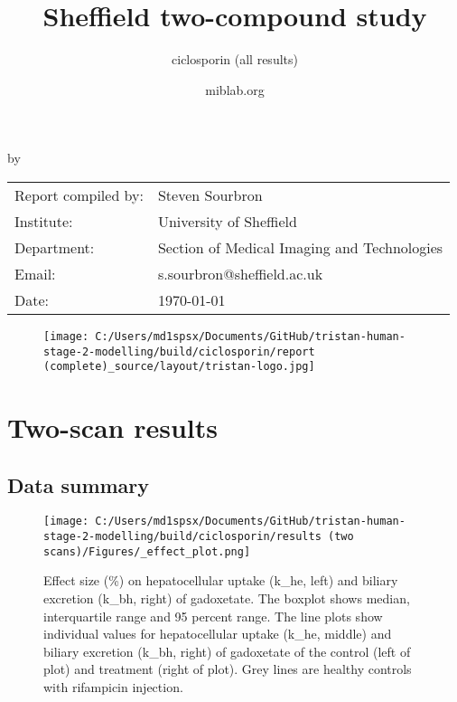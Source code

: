 \documentclass{epflreport}%
\begin{document}
%
\normalsize%
\frontmatter%
\title{Sheffield two{-}compound study}%
\subtitle{ciclosporin (all results)}%
\author{miblab.org}%
\subject{D2.10 {-} Internal report}%
%
%
%
\makecover%
\begin{titlepage}%
\begin{center}%
\makeatletter%
\largetitlestyle\fontsize{45}{45}\selectfont\@title%
\makeatother%
\linebreak%
\makeatletter%
\ifdefvoid{\@subtitle}{}{\bigskip\titlestyle\fontsize{20}{20}\selectfont\@subtitle}%
\makeatother%
\linebreak%
\bigskip%
\bigskip%
by%
\linebreak%
\bigskip%
\bigskip%
\makeatletter%
\largetitlestyle\fontsize{25}{25}\selectfont\@author%
\makeatother%
\vfill%
\large%
\begin{tabular}{ll}%
\hline%
Report compiled by: &Steven Sourbron\\%
Institute: &University of Sheffield\\%
Department: &Section of Medical Imaging and Technologies\\%
Email: &s.sourbron@sheffield.ac.uk\\%
Date: &\today\\%
\hline%
\end{tabular}%


\begin{figure}[b!]%
\centering%
\centering%
\texttt{[image: C:/Users/md1spsx/Documents/GitHub/tristan-human-stage-2-modelling/build/ciclosporin/report (complete)\_source/layout/tristan-logo.jpg]}%
\end{figure}

%
\end{center}%
\end{titlepage}%
\newpage%
\tableofcontents%
\mainmatter%
\clearpage%
\chapter{Two{-}scan results}%
\section{Data summary}%
\label{sec:Datasummary}%

%


\begin{figure}[h!]%
\centering%
\texttt{[image: C:/Users/md1spsx/Documents/GitHub/tristan-human-stage-2-modelling/build/ciclosporin/results (two scans)/Figures/\_effect\_plot.png]}%
\caption{Effect size (\%) on hepatocellular uptake (k\_he, left) and biliary excretion (k\_bh, right) of gadoxetate. The boxplot shows median, interquartile range and 95 percent range. The line plots show individual values for hepatocellular uptake (k\_he, middle) and biliary excretion (k\_bh, right) of gadoxetate of the control (left of plot) and treatment (right of plot). Grey lines are healthy controls with rifampicin injection.}%
\end{figure}
\end{document}
